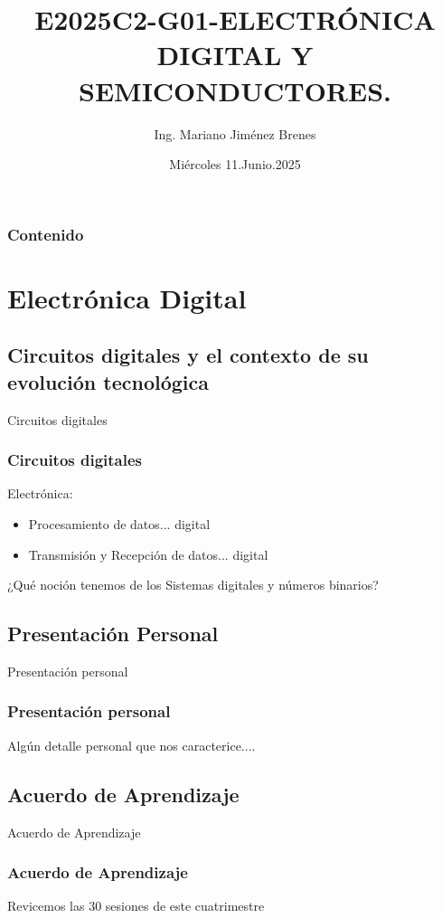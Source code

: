 \documentclass[11pt]{beamer}
\author{Ing. Mariano Jim\'enez Brenes}
\title
{
E2025C2-G01-ELECTRÓNICA DIGITAL Y SEMICONDUCTORES.
}
\institute{
Universidad Castro Carazo\linebreak
T\'ecnico En Semiconductores
}
\date{Mi\'ercoles 11.Junio.2025}
\begin{document}
\begin{frame}
\maketitle 
\end{frame}

\logo{}

\begin{frame}
\frametitle{Contenido}
\tableofcontents
\end{frame}


\section{Electr\'onica Digital}
\subsection{Circuitos digitales y el
contexto de su evoluci\'on
tecnol\'ogica}
\begin{frame}{Circuitos digitales}
\frametitle{Circuitos digitales}
Electr\'onica:
	\begin{itemize}
		\item Procesamiento de datos... digital
		\item Transmisi\'on y Recepci\'on de datos... digital
	\end{itemize}
	¿Qu\'e noci\'on tenemos de los Sistemas digitales y n\'umeros binarios?
\end{frame}
\subsection{Presentaci\'on Personal}
\begin{frame}{Presentaci\'on personal}
\frametitle{Presentaci\'on personal}
Alg\'un detalle personal que nos caracterice....
\end{frame}
\subsection{Acuerdo de Aprendizaje}
\begin{frame}{Acuerdo de Aprendizaje}
\frametitle{Acuerdo de Aprendizaje}
Revicemos las 30 sesiones de este cuatrimestre
\end{frame}
\end{document}
